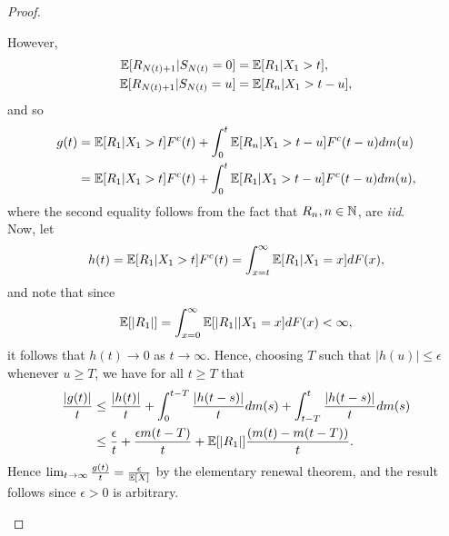 \documentclass[a4paper,10pt,english]{article}
\begin{document}
\begin{proof}
\begin{enumerate}[(a)]
However,
\begin{align*}
	\mathbb{E}[R_{N(t)+1}|S_{N(t)}=0] &= \mathbb{E}[R_1|X_1>t], \\
	\mathbb{E}[R_{N(t)+1}|S_{N(t)}=u] &= \mathbb{E}[R_n|X_1>t-u], 
\end{align*}
and so
\begin{align*}
g(t) &= \mathbb{E}[R_1|X_1>t]F^c(t)+\int_{0}^{t}\mathbb{E}[R_n|X_1>t-u]F^c(t-u)dm(u)\\
&= \mathbb{E}[R_1|X_1>t]F^c(t)+\int_{0}^{t}\mathbb{E}[R_1|X_1>t-u]F^c(t-u)dm(u),
\end{align*}
where the second equality follows from the fact that $ R_n, n \in \mathbb{N} $, are \textit{iid}. \\
Now, let
\begin{equation}
h(t)=\mathbb{E}[R_1|X_1>t]F^c(t) = \int_{x=t}^{\infty} \mathbb{E}[R_1|X_1=x]dF(x), \nonumber
\end{equation}
and note that since
\begin{equation}
\mathbb{E}[|R_1|] = \int_{x=0}^{\infty} \mathbb{E}[|R_1||X_1=x]dF(x) < \infty, \nonumber
\end{equation}
it follows that $h(t) \to 0$ as $t \to \infty.$ Hence, choosing $T$ such that $|h(u)| \leq \epsilon$ whenever $ u \geq T$, we have for all $t \geq T$ that
\begin{align*}
\frac{|g(t)|}{t} &\leq \frac{|h(t)|}{t} +\int_{0}^{t-T}\frac{|h(t-s)|}{t}dm(s)+\int_{t-T}^{t}\frac{|h(t-s)|}{t}dm(s)\\
&\leq \frac{\epsilon}{t}+ \frac{\epsilon m(t-T)}{t}+ \mathbb{E}[|R_1|]\frac{(m(t)-m(t-T))}{t} .
\end{align*}
Hence $\lim_{t \to \infty}\frac{g(t)}{t}= \frac{\epsilon}{\mathbb{E}[X]}$ by the
elementary renewal theorem, and the result follows since $\epsilon >
0$ is arbitrary.
\end{enumerate}
 \end{proof}
\end{document}

